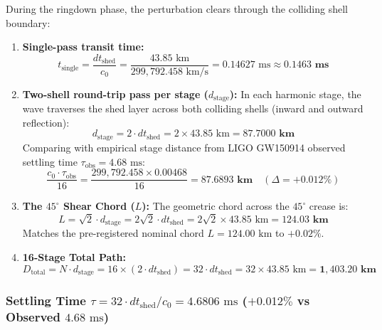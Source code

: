 \documentclass[11pt,a4paper]{article}
\begin{document}
During the ringdown phase, the perturbation clears through the colliding shell boundary:
\begin{enumerate}
    \item \textbf{Single-pass transit time:}
    \begin{equation}
    t_{\text{single}} = \frac{dt_{\text{shed}}}{c_0} = \frac{43.85\text{ km}}{299,792.458\text{ km/s}} = 0.14627\text{ ms} \approx \mathbf{0.1463\text{ ms}}
    \end{equation}
    \item \textbf{Two-shell round-trip pass per stage ($d_{\text{stage}}$):}
    In each harmonic stage, the wave traverses the shed layer across both colliding shells (inward and outward reflection):
    \begin{equation}
    d_{\text{stage}} = 2 \cdot dt_{\text{shed}} = 2 \times 43.85\text{ km} = \mathbf{87.7000\text{ km}}
    \end{equation}
    Comparing with empirical stage distance from LIGO GW150914 observed settling time $\tau_{\text{obs}} = 4.68\text{ ms}$:
    \begin{equation}
    \frac{c_0 \cdot \tau_{\text{obs}}}{16} = \frac{299,792.458 \times 0.00468}{16} = \mathbf{87.6893\text{ km}} \quad (\Delta = +0.012\%)
    \end{equation}
    \item \textbf{The $45^\circ$ Shear Chord ($L$):}
    The geometric chord across the $45^\circ$ crease is:
    \begin{equation}
    L = \sqrt{2} \cdot d_{\text{stage}} = 2\sqrt{2} \cdot dt_{\text{shed}} = 2\sqrt{2} \times 43.85\text{ km} = \mathbf{124.03\text{ km}}
    \end{equation}
    Matches the pre-registered nominal chord $L = 124.00\text{ km}$ to \textbf{$+0.02\%$}.
    \item \textbf{16-Stage Total Path:}
    \begin{equation}
    D_{\text{total}} = N \cdot d_{\text{stage}} = 16 \times (2 \cdot dt_{\text{shed}}) = 32 \cdot dt_{\text{shed}} = 32 \times 43.85\text{ km} = \mathbf{1,403.20\text{ km}}
    \end{equation}
\end{enumerate}

\subsubsection{Settling Time $\tau = 32 \cdot dt_{\text{shed}} / c_0 = 4.6806\text{ ms}$ ($+0.012\%$ vs Observed $4.68\text{ ms}$)}
\label{subsubsec:tau_settling_proof}
\end{document}
